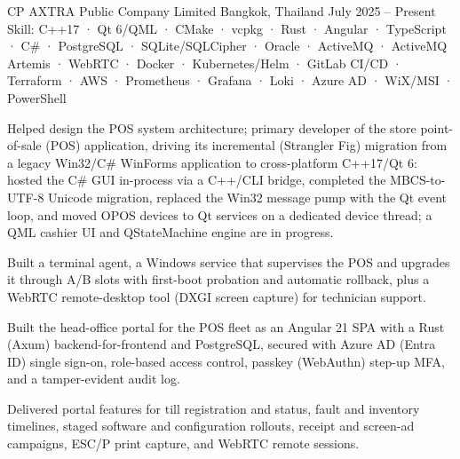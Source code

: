 
\begin{cventries}

    {CP AXTRA Public Company Limited} %
    {Bangkok, Thailand} %
    {July 2025 -- Present} %
    {Skill: C++17 · Qt 6/QML · CMake · vcpkg · Rust · Angular · TypeScript · C\# · PostgreSQL · SQLite/SQLCipher · Oracle · ActiveMQ · ActiveMQ Artemis · WebRTC · Docker · Kubernetes/Helm · GitLab CI/CD · Terraform · AWS · Prometheus · Grafana · Loki · Azure AD · WiX/MSI · PowerShell} %
    {
      \begin{cvitems} %
      \item { Helped design the POS system architecture; primary developer of the store point-of-sale (POS) application, driving its incremental (Strangler Fig) migration from a legacy Win32/C\# WinForms application to cross-platform C++17/Qt 6: hosted the C\# GUI in-process via a C++/CLI bridge, completed the MBCS-to-UTF-8 Unicode migration, replaced the Win32 message pump with the Qt event loop, and moved OPOS devices to Qt services on a dedicated device thread; a QML cashier UI and QStateMachine engine are in progress.}
      \item { Built a terminal agent, a Windows service that supervises the POS and upgrades it through A/B slots with first-boot probation and automatic rollback, plus a WebRTC remote-desktop tool (DXGI screen capture) for technician support.}
      \item { Built the head-office portal for the POS fleet as an Angular 21 SPA with a Rust (Axum) backend-for-frontend and PostgreSQL, secured with Azure AD (Entra ID) single sign-on, role-based access control, passkey (WebAuthn) step-up MFA, and a tamper-evident audit log.}
      \item { Delivered portal features for till registration and status, fault and inventory timelines, staged software and configuration rollouts, receipt and screen-ad campaigns, ESC/P print capture, and WebRTC remote sessions.}

\end{cvitems}}
\end{cventries}
